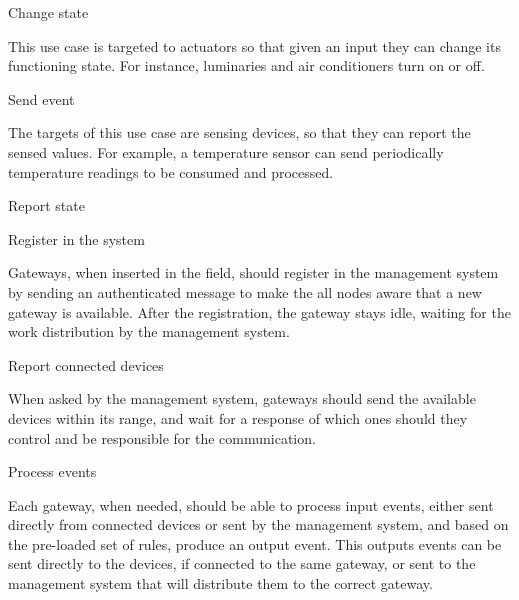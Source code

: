 \begin{Paragraph}{Change state} %
	
This use case is targeted to actuators so that given an input they can change its functioning state. For instance, luminaries and air conditioners turn on or off.
	
\end{Paragraph}

\begin{Paragraph}{Send event} %
	
The targets of this use case are sensing devices, so that they can report the sensed values. For example, a temperature sensor can send periodically temperature readings to be consumed and processed.
	
\end{Paragraph}

\begin{Paragraph}{Report state}
	

	
\end{Paragraph}

\begin{Paragraph}{Register in the system}
	
Gateways, when inserted in the field, should register in the management system by sending an authenticated message to make the all nodes aware that a new gateway is available. After the registration, the gateway stays idle, waiting for the work distribution by the management system.
	
\end{Paragraph}

\begin{Paragraph}{Report connected devices}
	
When asked by the management system, gateways should send the available devices within its range, and wait for a response of which ones should they control and be responsible for the communication. 
	
\end{Paragraph}

\begin{Paragraph}{Process events}
	
Each gateway, when needed, should be able to process input events, either sent directly from connected devices or sent by the management system, and based on the pre-loaded set of rules, produce an output event. This outputs events can be sent directly to the devices, if connected to the same gateway, or sent to the management system that will distribute them to the correct gateway.

\end{Paragraph}

